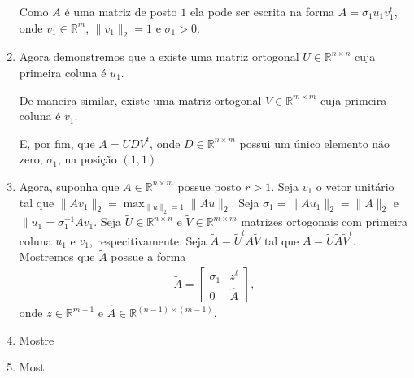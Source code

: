 \documentclass[a4paper,12pt, leqno, answers]{exam}
\begin{document}
\begin{questions}
\begin{solution}
\begin{enumerate}
                Como $A$ \'{e} uma matriz de posto $1$ ela pode ser escrita na forma $A = \sigma_1 u_1 v_1^t$, onde $v_1 \in \mathbb{R}^m$, $\| v_1 \|_2 = 1$ e $\sigma_1 > 0$.

            \item Agora demonstremos que a existe uma matriz ortogonal $U \in \mathbb{R}^{n \times n}$ cuja primeira coluna \'{e} $u_1$.

                De maneira similar, existe uma matriz ortogonal $V \in \mathbb{R}^{m \times m}$ cuja primeira coluna \'{e} $v_1$.

                E, por fim, que $A = U D V^t$, onde $D \in \mathbb{R}^{n \times m}$ possui um \'{u}nico elemento n\~{a}o zero, $\sigma_1$, na posi\c{c}\~{a}o $(1,1)$.

            \item Agora, suponha que $A \in \mathbb{R}^{n \times m}$ possue posto $r > 1$. Seja $v_1$ o vetor unit\'{a}rio tal que $\| A v_1 \|_2 = \max_{\| u \|_2 = 1} \| A u \|_2$. Seja $\sigma_1 = \| A u_1 \|_2 = \| A \|_2$ e $\| u_1 = \sigma_1^{-1} A v_1$. Seja $\tilde{U} \in \mathbb{R}^{n \times n}$ e $\tilde{V} \in \mathbb{R}^{m \times m}$ matrizes ortogonais com primeira coluna $u_1$ e $v_1$, respecitivamente. Seja $\tilde{A} = \tilde{U}^t A \tilde{V}$ tal que $A = \tilde{U} \tilde{A} \tilde{V}^t$. Mostremos que $\tilde{A}$ possue a forma
                \begin{align*}
                    \tilde{A} = \begin{bmatrix}
                        \sigma_1 & z^t \\
                        0 & \hat{A}
                    \end{bmatrix},
                \end{align*}
                onde $z \in \mathbb{R}^{m -1}$ e $\hat{A} \in \mathbb{R}^{(n - 1) \times (m - 1)}$.

            \item Mostre

            \item Most
        \end{enumerate}
    \end{solution}
\end{questions}


\end{document}
